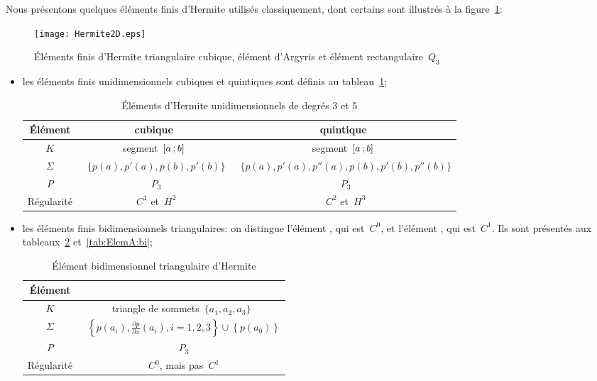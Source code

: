Nous présentons quelques éléments finis d'Hermite utilisés classiquement, dont certains sont illustrés à la figure~\ref{Hermite2D}:
\begin{figure}[h!]
\centering
\texttt{[image: Hermite2D.eps]}
\caption{Éléments finis d'Hermite triangulaire cubique, élément d'Argyris et élément rectangulaire~$Q_3$}\label{Hermite2D}
\end{figure}
\begin{itemize}
\item les éléments finis unidimensionnels cubiques et quintiques sont définis au tableau~\ref{tab:ElemH:uni};
\begin{table}[h!]\centering\small
\begin{tabular}{c|cc}
Élément & cubique & quintique\\
\hline
$K$	  & segment~$\mathopen{[}a\,;b\mathclose{]}$ & segment~$\mathopen{[}a\,;b\mathclose{]}$\\
$\Sigma$ &~$\{p(a), p'(a), p(b), p'(b)\}$ &~$\{p(a), p'(a), p''(a), p(b), p'(b), p''(b)\}$\\
$P$   &~$P_3$ &~$P_3$\\
Régularité &~$C^1$ et~$H^2$ &~$C^2$ et~$H^3$\\
\hline
\end{tabular}
\caption{Éléments d'Hermite unidimensionnels de degrés 3 et 5}\label{tab:ElemH:uni}
\end{table}
\item les éléments finis bidimensionnels triangulaires:
	on distingue l'élément , qui est~$C^0$, et
  l'élément , qui est~$C^1$.
	Ils sont présentés aux tableaux~\ref{tab:ElemH:bi} et~\ref{tab:ElemA:bi};
\begin{table}[h!]\centering\small
\begin{tabular}{c|c}
Élément &\\
\hline
$K$	  & triangle de sommets~$\{a_1, a_2, a_3\}$\\
$\Sigma$ &~$\left\{p(a_i), \frac{\partial p}{\partial x}(a_i), i=1, 2, 3\right\} \cup\left\{p(a_0)\right\}$\\
$P$   &~$P_3$\\
Régularité &~$C^0$, mais pas~$C^1$\\
\hline
\end{tabular}\caption{Élément bidimensionnel triangulaire d'Hermite}\label{tab:ElemH:bi}
\end{table}
\begin{table}[h!]\centering\small
\begin{tabular}{c|cc}

\end{tabular}
\end{table}
\end{itemize}
